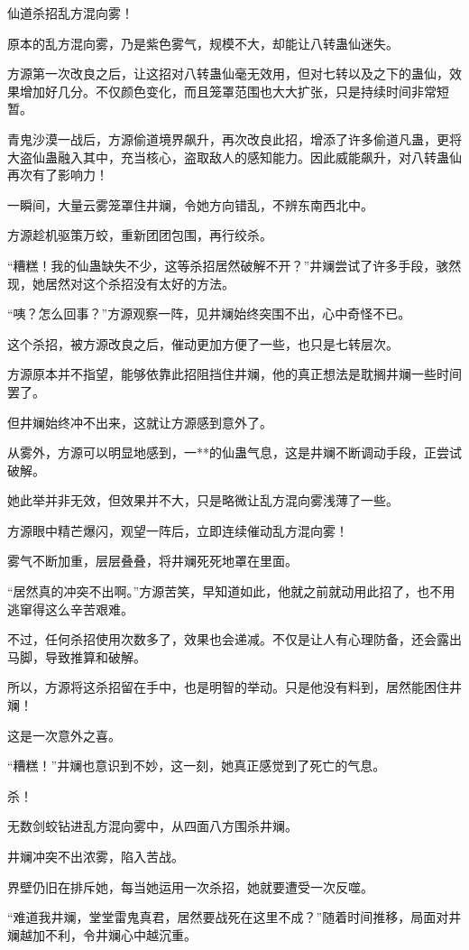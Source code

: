 \begin{this_body}
仙道杀招乱方混向雾！

原本的乱方混向雾，乃是紫色雾气，规模不大，却能让八转蛊仙迷失。

方源第一次改良之后，让这招对八转蛊仙毫无效用，但对七转以及之下的蛊仙，效果增加好几分。不仅颜色变化，而且笼罩范围也大大扩张，只是持续时间非常短暂。

青鬼沙漠一战后，方源偷道境界飙升，再次改良此招，增添了许多偷道凡蛊，更将大盗仙蛊融入其中，充当核心，盗取敌人的感知能力。因此威能飙升，对八转蛊仙再次有了影响力！

一瞬间，大量云雾笼罩住井斓，令她方向错乱，不辨东南西北中。

方源趁机驱策万蛟，重新团团包围，再行绞杀。

“糟糕！我的仙蛊缺失不少，这等杀招居然破解不开？”井斓尝试了许多手段，骇然现，她居然对这个杀招没有太好的方法。

“咦？怎么回事？”方源观察一阵，见井斓始终突围不出，心中奇怪不已。

这个杀招，被方源改良之后，催动更加方便了一些，也只是七转层次。

方源原本并不指望，能够依靠此招阻挡住井斓，他的真正想法是耽搁井斓一些时间罢了。

但井斓始终冲不出来，这就让方源感到意外了。

从雾外，方源可以明显地感到，一**的仙蛊气息，这是井斓不断调动手段，正尝试破解。

她此举并非无效，但效果并不大，只是略微让乱方混向雾浅薄了一些。

方源眼中精芒爆闪，观望一阵后，立即连续催动乱方混向雾！

雾气不断加重，层层叠叠，将井斓死死地罩在里面。

“居然真的冲突不出啊。”方源苦笑，早知道如此，他就之前就动用此招了，也不用逃窜得这么辛苦艰难。

不过，任何杀招使用次数多了，效果也会递减。不仅是让人有心理防备，还会露出马脚，导致推算和破解。

所以，方源将这杀招留在手中，也是明智的举动。只是他没有料到，居然能困住井斓！

这是一次意外之喜。

“糟糕！”井斓也意识到不妙，这一刻，她真正感觉到了死亡的气息。

杀！

无数剑蛟钻进乱方混向雾中，从四面八方围杀井斓。

井斓冲突不出浓雾，陷入苦战。

界壁仍旧在排斥她，每当她运用一次杀招，她就要遭受一次反噬。

“难道我井斓，堂堂雷鬼真君，居然要战死在这里不成？”随着时间推移，局面对井斓越加不利，令井斓心中越沉重。


\end{this_body}
